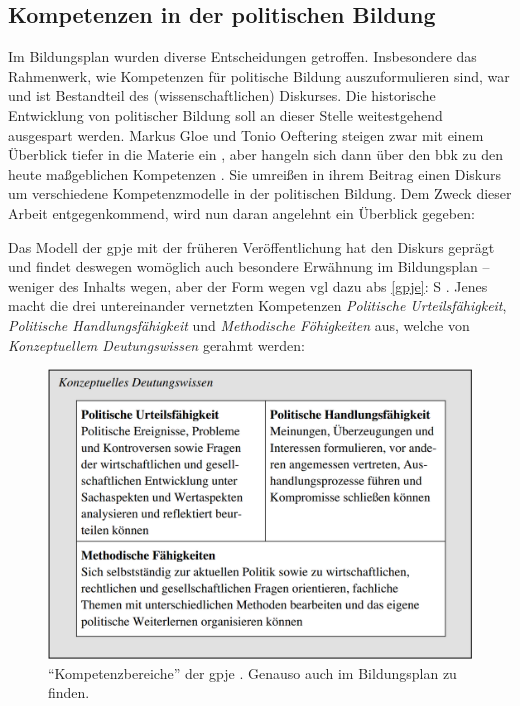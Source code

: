 \subsection{Kompetenzen in der politischen Bildung}
Im Bildungsplan wurden diverse Entscheidungen getroffen. Insbesondere das Rahmenwerk, wie Kompetenzen für politische Bildung auszuformulieren sind, war und ist Bestandteil des (wissenschaftlichen) Diskurses. Die historische Entwicklung von politischer Bildung soll an dieser Stelle weitestgehend ausgespart werden.
Markus Gloe und Tonio Oeftering steigen zwar mit einem Überblick tiefer in die Materie ein \autocite[95-100]{Gloe2020}, aber hangeln sich dann über den \gls{bbk} \autocite[101-103; in dieser Arbeit \gls{s} \gls{abs} \ref{bbk}: \gls{S} \pageref{bbk}]{Gloe2020} zu den heute maßgeblichen Kompetenzen \autocite[104-114]{Gloe2020}. Sie umreißen in ihrem Beitrag einen Diskurs um verschiedene Kompetenzmodelle in der politischen Bildung. Dem Zweck dieser Arbeit entgegenkommend, wird nun daran angelehnt ein Überblick gegeben:

Das Modell der \gls{gpje} mit der früheren Veröffentlichung \citeyear{gpje2004} hat den Diskurs geprägt und findet deswegen womöglich auch besondere Erwähnung im Bildungsplan -- weniger des Inhalts wegen, aber der Form wegen \gls{vgl} dazu \gls{abs} \ref{gpje}: \gls{S} \pageref{gpje}.
Jenes macht die drei untereinander vernetzten Kompetenzen \emph{Politische Urteilsfähigkeit}, \emph{Politische Handlungsfähigkeit} und \emph{Methodische Föhigkeiten} aus, welche von \emph{Konzeptuellem Deutungswissen} gerahmt werden:
\begin{figure}[H]
    \centering
    \includegraphics[width=1\linewidth]{gpje 2004 Kompetenzmodell S. 13.png}
    \caption{\enquote{Kompetenzbereiche} der \gls{gpje} \autocite[13]{gpje2004}. Genauso auch im Bildungsplan \autocite[10]{bplan} zu finden.}
    \label{gpjeKompetenzmodell}
\end{figure}

